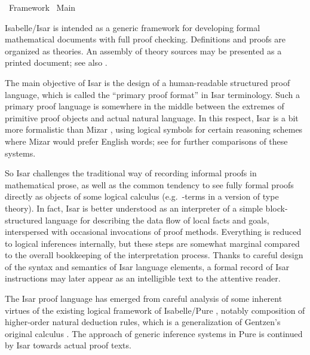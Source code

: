 %
\begin{isabellebody}%
\def\isabellecontext{Framework}%
%
\isadelimtheory
%
\endisadelimtheory
%
\isatagtheory
{}\isamarkupfalse%
\ Framework\isanewline
{}\ Main\isanewline
{}%
\endisatagtheory
{\isafoldtheory}%
%
\isadelimtheory
%
\endisadelimtheory
%
\isamarkuptrue%
%
\begin{isamarkuptext}%
Isabelle/Isar
  \cite{Wenzel:1999:TPHOL,Wenzel-PhD,Nipkow-TYPES02,Wenzel-Paulson:2006,Wenzel:2006:Festschrift}
  is intended as a generic framework for developing formal
  mathematical documents with full proof checking.  Definitions and
  proofs are organized as theories.  An assembly of theory sources may
  be presented as a printed document; see also
  .

  The main objective of Isar is the design of a human-readable
  structured proof language, which is called the ``primary proof
  format'' in Isar terminology.  Such a primary proof language is
  somewhere in the middle between the extremes of primitive proof
  objects and actual natural language.  In this respect, Isar is a bit
  more formalistic than Mizar
  \cite{Trybulec:1993:MizarFeatures,Rudnicki:1992:MizarOverview,Wiedijk:1999:Mizar},
  using logical symbols for certain reasoning schemes where Mizar
  would prefer English words; see \cite{Wenzel-Wiedijk:2002} for
  further comparisons of these systems.

  So Isar challenges the traditional way of recording informal proofs
  in mathematical prose, as well as the common tendency to see fully
  formal proofs directly as objects of some logical calculus (e.g.\
  -terms in a version of type theory).  In fact, Isar is
  better understood as an interpreter of a simple block-structured
  language for describing the data flow of local facts and goals,
  interspersed with occasional invocations of proof methods.
  Everything is reduced to logical inferences internally, but these
  steps are somewhat marginal compared to the overall bookkeeping of
  the interpretation process.  Thanks to careful design of the syntax
  and semantics of Isar language elements, a formal record of Isar
  instructions may later appear as an intelligible text to the
  attentive reader.

  The Isar proof language has emerged from careful analysis of some
  inherent virtues of the existing logical framework of Isabelle/Pure
  \cite{paulson-found,paulson700}, notably composition of higher-order
  natural deduction rules, which is a generalization of Gentzen's
  original calculus \cite{Gentzen:1935}.  The approach of generic
  inference systems in Pure is continued by Isar towards actual proof
  texts.


\end{isamarkuptext}
\end{isabellebody}
